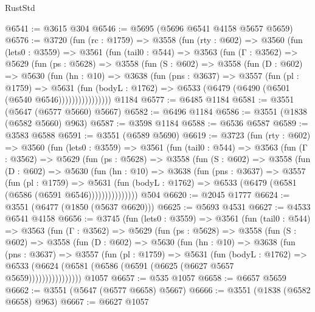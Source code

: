 \begin{lexlean}{RustStd}
\begin{coremodule}
@6541 := @3615 @304
@6546 := @5695 (@5696 @6541 @4158 @5657 @5659)
@6576 := @3720
    (fun (rc : @1759) =>
    @3558
      (fun (rty : @602) =>
      @3560
        (fun (lets0 : @3559) =>
        @3561
          (fun (tail0 : @544) =>
          @3563
            (fun (Γ : @3562) =>
            @5629
              (fun (ps : @5628) =>
              @3558
                (fun (S : @602) =>
                @3558
                  (fun (D : @602) =>
                  @5630
                    (fun (hn : @10) =>
                    @3638
                      (fun (pns : @3637) =>
                      @3557
                        (fun (pl : @1759) =>
                        @5631
                          (fun (bodyL : @1762) =>
                          @6533 (@6479 (@6490 (@6501 (@6540 @6546))))))))))))))))
    @1184
@6577 := @6485 @1184
@6581 := @3551 (@5647 (@6577 @5660) @5667)
@6582 := @6496 @1184
@6586 := @3551 (@1838 (@6582 @5660) @963)
@6587 := @3598 @1184
@6588 := @6536 @6587
@6589 := @3583 @6588
@6591 := @3551 (@6589 @5690)
@6619 := @3723
    (fun (rty : @602) =>
    @3560
      (fun (lets0 : @3559) =>
      @3561
        (fun (tail0 : @544) =>
        @3563
          (fun (Γ : @3562) =>
          @5629
            (fun (ps : @5628) =>
            @3558
              (fun (S : @602) =>
              @3558
                (fun (D : @602) =>
                @5630
                  (fun (hn : @10) =>
                  @3638
                    (fun (pns : @3637) =>
                    @3557
                      (fun (pl : @1759) =>
                      @5631
                        (fun (bodyL : @1762) =>
                        @6533 (@6479 (@6581 (@6586 (@6591 @6546)))))))))))))))
    @504
@6620 := @2045 @1777
@6624 := @3551 (@6477 (@1850 (@5637 @6620)))
@6625 := @5693 @4531
@6627 := @4533 @6541 @4158
@6656 := @3745
    (fun (lets0 : @3559) =>
    @3561
      (fun (tail0 : @544) =>
      @3563
        (fun (Γ : @3562) =>
        @5629
          (fun (ps : @5628) =>
          @3558
            (fun (S : @602) =>
            @3558
              (fun (D : @602) =>
              @5630
                (fun (hn : @10) =>
                @3638
                  (fun (pns : @3637) =>
                  @3557
                    (fun (pl : @1759) =>
                    @5631
                      (fun (bodyL : @1762) =>
                      @6533 (@6624 (@6581 (@6586 (@6591 (@6625 (@6627 @5657 @5659))))))))))))))))
    @1057
@6657 := @535 @1057
@6658 := @6657 @5659
@6662 := @3551 (@5647 (@6577 @6658) @5667)
@6666 := @3551 (@1838 (@6582 @6658) @963)
@6667 := @6627 @1057

\end{coremodule}
\end{lexlean}

